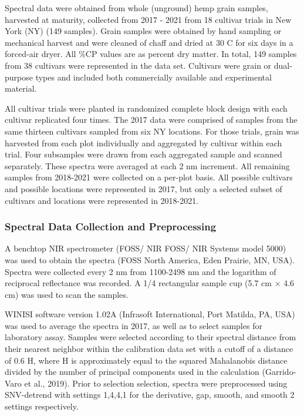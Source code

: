 \documentclass[
]{agujournal2019}
\begin{document}
Spectral data were obtained from whole (unground) hemp grain samples,
harvested at maturity, collected from 2017 - 2021 from 18 cultivar
trials in New York (NY) (149 samples). Grain samples were obtained by
hand sampling or mechanical harvest and were cleaned of chaff and dried
at 30 C for six days in a forced-air dryer. All \%CP values are as
percent dry matter. In total, 149 samples from 38 cultivars were
represented in the data set. Cultivars were grain or dual-purpose types
and included both commercially available and experimental material.

All cultivar trials were planted in randomized complete block design
with each cultivar replicated four times. The 2017 data were comprised
of samples from the same thirteen cultivars sampled from six NY
locations. For those trials, grain was harvested from each plot
individually and aggregated by cultivar within each trial. Four
subsamples were drawn from each aggregated sample and scanned
separately. These spectra were averaged at each 2 nm increment. All
remaining samples from 2018-2021 were collected on a per-plot basis. All
possible cultivars and possible locations were represented in 2017, but
only a selected subset of cultivars and locations were represented in
2018-2021.

\subsubsection{Spectral Data Collection and
Preprocessing}\label{spectral-data-collection-and-preprocessing}

A benchtop NIR spectrometer (FOSS/ NIR FOSS/ NIR Systems model 5000) was
used to obtain the spectra (FOSS North America, Eden Prairie, MN, USA).
Spectra were collected every 2 nm from 1100-2498 nm and the logarithm of
reciprocal reflectance was recorded. A 1/4 rectangular sample cup (5.7
cm × 4.6 cm) was used to scan the samples.

WINISI software version 1.02A (Infrasoft International, Port Matilda,
PA, USA) was used to average the spectra in 2017, as well as to select
samples for laboratory assay. Samples were selected according to their
spectral distance from their nearest neighbor within the calibration
data set with a cutoff of a distance of 0.6 H, where H is approximately
equal to the squared Mahalanobis distance divided by the number of
principal components used in the calculation (Garrido-Varo et al.,
2019). Prior to selection selection, spectra were preprocessed using
SNV-detrend with settings 1,4,4,1 for the derivative, gap, smooth, and
smooth 2 settings respectively.
\end{document}
